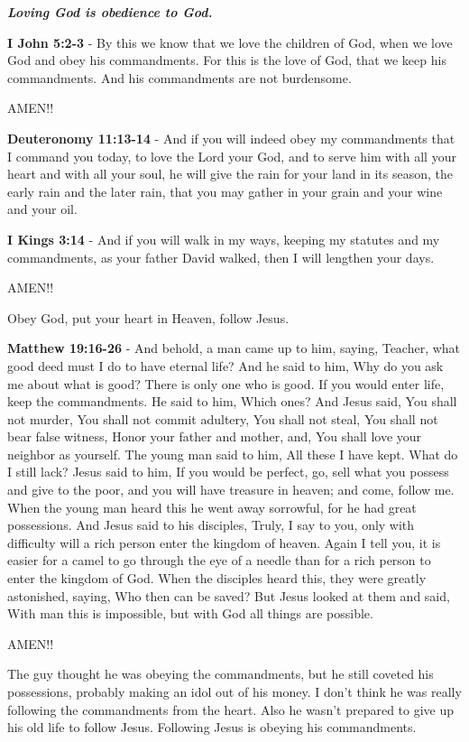 \documentclass[11pt]{article}
\begin{document}
\emph{\textbf{Loving God is obedience to God.}}

\textbf{I John 5:2-3} - By this we know that we love the children of God, when we love God and obey his commandments. For this is the love of God, that we keep his commandments. And his commandments are not burdensome.

AMEN!!

\textbf{Deuteronomy 11:13-14} - And if you will indeed obey my commandments that I command you today, to love the Lord your God, and to serve him with all your heart and with all your soul, he will give the rain for your land in its season, the early rain and the later rain, that you may gather in your grain and your wine and your oil.

\textbf{I Kings 3:14} - And if you will walk in my ways, keeping my statutes and my commandments, as your father David walked, then I will lengthen your days.

AMEN!!

Obey God, put your heart in Heaven, follow Jesus.

\textbf{Matthew 19:16-26} - And behold, a man came up to him, saying, Teacher, what good deed must I do to have eternal life? And he said to him, Why do you ask me about what is good? There is only one who is good. If you would enter life, keep the commandments. He said to him, Which ones? And Jesus said, You shall not murder, You shall not commit adultery, You shall not steal, You shall not bear false witness, Honor your father and mother, and, You shall love your neighbor as yourself. The young man said to him, All these I have kept. What do I still lack? Jesus said to him, If you would be perfect, go, sell what you possess and give to the poor, and you will have treasure in heaven; and come, follow me. When the young man heard this he went away sorrowful, for he had great possessions. And Jesus said to his disciples, Truly, I say to you, only with difficulty will a rich person enter the kingdom of heaven. Again I tell you, it is easier for a camel to go through the eye of a needle than for a rich person to enter the kingdom of God. When the disciples heard this, they were greatly astonished, saying, Who then can be saved? But Jesus looked at them and said, With man this is impossible, but with God all things are possible.

AMEN!!

The guy thought he was obeying the commandments, but he still coveted his possessions, probably making an idol out of his money.
I don't think he was really following the commandments from the heart.
Also he wasn't prepared to give up his old life to follow Jesus.
Following Jesus is obeying his commandments.
\end{document}
